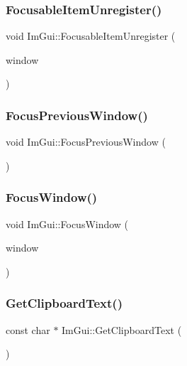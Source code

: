 \subsubsection{\texorpdfstring{Focusable\+Item\+Unregister()}{FocusableItemUnregister()}}
{\footnotesize\ttfamily void Im\+Gui\+::\+Focusable\+Item\+Unregister (\begin{DoxyParamCaption}\item[{\hyperlink{struct_im_gui_window}{Im\+Gui\+Window} $\ast$}]{window }\end{DoxyParamCaption})}

\hypertarget{namespace_im_gui_a71f3fa3da1f6e029fb324d1d41fee0ad}{}\label{namespace_im_gui_a71f3fa3da1f6e029fb324d1d41fee0ad} 
\subsubsection{\texorpdfstring{Focus\+Previous\+Window()}{FocusPreviousWindow()}}
{\footnotesize\ttfamily void Im\+Gui\+::\+Focus\+Previous\+Window (\begin{DoxyParamCaption}{ }\end{DoxyParamCaption})\hspace{0.3cm}{\ttfamily [static]}}

\hypertarget{namespace_im_gui_ade4c08e7e7ad7bbfa4835248f5f3a7c6}{}\label{namespace_im_gui_ade4c08e7e7ad7bbfa4835248f5f3a7c6} 
\subsubsection{\texorpdfstring{Focus\+Window()}{FocusWindow()}}
{\footnotesize\ttfamily void Im\+Gui\+::\+Focus\+Window (\begin{DoxyParamCaption}\item[{\hyperlink{struct_im_gui_window}{Im\+Gui\+Window} $\ast$}]{window }\end{DoxyParamCaption})}

\hypertarget{namespace_im_gui_a11837daee819fd90e17d80ab1eef1f99}{}\label{namespace_im_gui_a11837daee819fd90e17d80ab1eef1f99} 
\subsubsection{\texorpdfstring{Get\+Clipboard\+Text()}{GetClipboardText()}}
{\footnotesize\ttfamily const char $\ast$ Im\+Gui\+::\+Get\+Clipboard\+Text (\begin{DoxyParamCaption}{ }\end{DoxyParamCaption})}

